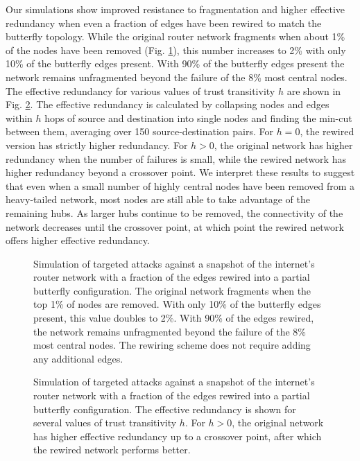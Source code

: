 \documentclass[10pt,letterpaper]{article}
\providecommand{\DIFaddbegin}{} %
\providecommand{\DIFdelbegin}{} %
\providecommand{\DIFdelend}{} %
\providecommand{\DIFaddbeginFL}{} %
\providecommand{\DIFaddendFL}{} %
\providecommand{\DIFdelbeginFL}{} %
\providecommand{\DIFdelendFL}{} %
\begin{document}
Our simulations show improved resistance to fragmentation and higher
effective redundancy when even a fraction of edges have been rewired to
match the butterfly topology.
While the original router network fragments when about 1\% of the nodes
have been removed (Fig. \ref{fig:diameter}),
this number increases to 2\%
with only 10\% of the butterfly edges present.
With 90\% of the butterfly edges present
the network remains unfragmented beyond the failure of the 8\% most
central nodes.
The effective redundancy for various values of trust transitivity $h$
are shown in Fig. \ref{fig:mincut}.
The effective redundancy is calculated by collapsing nodes and edges within
$h$ hops of source and destination into single nodes and finding the min-cut
between them,
averaging over 150 source-destination pairs.
For $h=0$, the rewired version has strictly higher redundancy.
For $h>0$,
the original network has higher redundancy when the number of failures is small,
while the rewired network has higher redundancy beyond a crossover point.
We interpret these results to suggest that even when a small number of
highly central nodes have been removed from a heavy-tailed network,
most nodes are still able to take advantage of the remaining hubs.
As larger hubs continue to be removed, the connectivity of the network
decreases until the crossover point,
at which point the rewired network offers higher effective redundancy.

\DIFdelbegin %
\DIFdelendFL \DIFaddbeginFL \begin{figure}[H]
\DIFaddendFL %
\caption{
Simulation of targeted attacks against a snapshot of the internet's router
network with a fraction of the edges rewired into a partial butterfly configuration.
The original network fragments when the top 1\% of nodes are removed.
With only 10\% of the butterfly edges present,
this value doubles to 2\%.
With 90\% of the edges rewired,
the network remains unfragmented beyond the failure of the 8\% most
central nodes.
The rewiring scheme does not require adding any additional edges.
}
\label{fig:diameter}
\end{figure}

\DIFdelbegin %
\DIFdelendFL \DIFaddbeginFL \begin{figure}[H]
\DIFaddendFL %
\caption{
Simulation of targeted attacks against a snapshot of the internet's router
network with a fraction of the edges rewired into a partial butterfly configuration.
The effective redundancy is shown for several values of trust transitivity $h$.
For $h>0$, the original network has higher effective redundancy up to a crossover point,
after which the rewired network performs better.
}
\label{fig:mincut}
\DIFdelbeginFL %
\DIFdelend \DIFaddbegin \end{figure}
\end{document}
